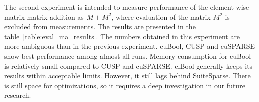 The second experiment is intended to measure performance of the element-wise matrix-matrix addition as $M + M^2$,
where evaluation of the matrix $M^2$ is excluded from measurements.
The results are presented in the table~\ref{table:eval_ma_results}.
The numbers obtained in this experiment are more ambiguous than in the previous experiment.
cuBool, CUSP and cuSPARSE show best performance among almost all runs.
Memory consumption for cuBool is relatively small compared to CUSP and cuSPARSE. 
clBool generally keeps its results within acceptable limits.
However, it still lags behind SuiteSparse. 
There is still space for optimizations, 
so it requires a deep investigation in our future research.


